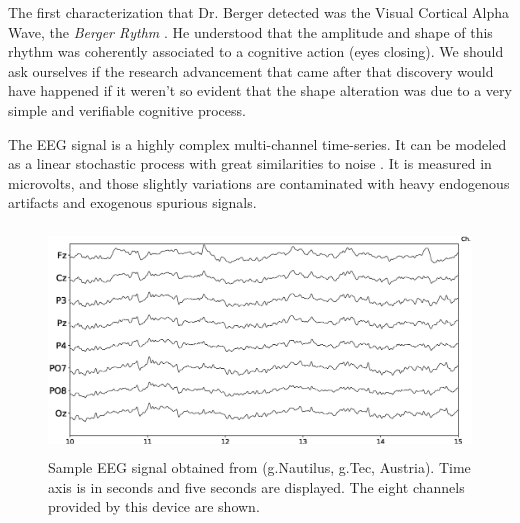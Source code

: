 

The first characterization that Dr. Berger detected was the Visual Cortical Alpha Wave, the \textit{Berger Rythm} \cite{Jansen1991}.  He understood that the amplitude and shape of this rhythm was coherently associated to a cognitive action (eyes closing).  
We should ask ourselves if the research advancement that came after that discovery would have happened if it weren't so evident that the shape alteration was due to a very simple and verifiable cognitive process.

The EEG signal is a highly complex multi-channel time-series.  It can be modeled as a linear stochastic process with great similarities to noise \cite{Thakor2004}.  It is measured in microvolts, and those slightly variations are contaminated with heavy endogenous artifacts and exogenous spurious signals.  
 
\begin{figure}[]
\centering
\includegraphics[height=6cm,width=14cm]{images/sampleeeg.eps}
\caption[Sample Multichannel EEG signal]{Sample EEG signal obtained from (g.Nautilus, g.Tec, Austria). Time axis is in seconds and five seconds are displayed.  The eight channels provided by this device are shown.}
\label{fig:sampleeeg}
\end{figure}



